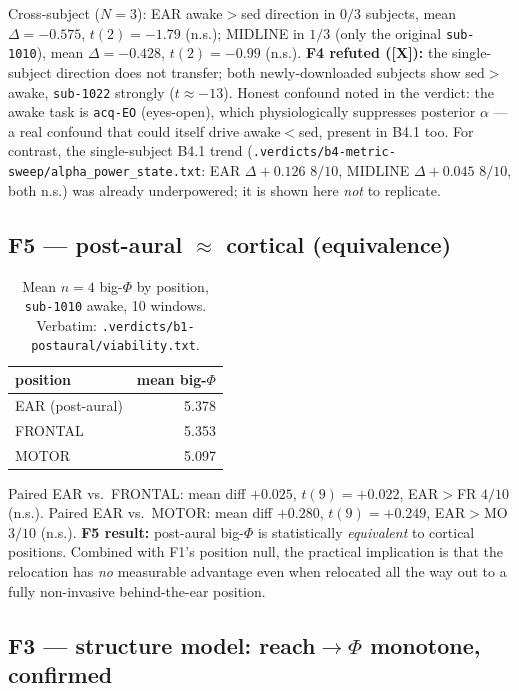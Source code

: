 \documentclass[11pt,a4paper]{article}
\providecommand{\tierRed}{\textbf{[X]}}     %
\begin{document}
\noindent
Cross-subject ($N{=}3$): EAR awake$>$sed direction in $0/3$ subjects, mean
$\Delta{=}{-}0.575$, $t(2){=}{-}1.79$ (n.s.); MIDLINE in $1/3$ (only the
original \texttt{sub-1010}), mean $\Delta{=}{-}0.428$, $t(2){=}{-}0.99$ (n.s.).
\textbf{F4 refuted (\tierRed):} the single-subject direction does not transfer;
both newly-downloaded subjects show sed$>$awake, \texttt{sub-1022} strongly
($t{\approx}{-}13$). Honest confound noted in the verdict: the awake task is
\texttt{acq-EO} (eyes-open), which physiologically suppresses posterior
$\alpha$ --- a real confound that could itself drive awake$<$sed, present in
B4.1 too. For contrast, the single-subject B4.1 trend
(\texttt{.verdicts/b4-metric-sweep/alpha\_power\_state.txt}: EAR
$\Delta{+}0.126$ $8/10$, MIDLINE $\Delta{+}0.045$ $8/10$, both n.s.) was already
underpowered; it is shown here \emph{not} to replicate.

\subsection{F5 --- post-aural $\approx$ cortical (equivalence)}
\label{sub:f5}

\begin{table}[h]
\centering
\caption{Mean $n{=}4$ big-$\Phi$ by position, \texttt{sub-1010} awake, 10
windows. Verbatim: \texttt{.verdicts/b1-postaural/viability.txt}.}
\label{tab:f5}
\small
\begin{tabular}{@{}lr@{}}
\toprule
position & mean big-$\Phi$ \\
\midrule
EAR (post-aural) & 5.378 \\
FRONTAL          & 5.353 \\
MOTOR            & 5.097 \\
\bottomrule
\end{tabular}
\end{table}

\noindent
Paired EAR vs.\ FRONTAL: mean diff $+0.025$, $t(9){=}+0.022$, EAR$>$FR $4/10$
(n.s.). Paired EAR vs.\ MOTOR: mean diff $+0.280$, $t(9){=}+0.249$, EAR$>$MO
$3/10$ (n.s.). \textbf{F5 result:} post-aural big-$\Phi$ is statistically
\emph{equivalent} to cortical positions. Combined with F1's position null, the
practical implication is that the relocation has \emph{no} measurable advantage
even when relocated all the way out to a fully non-invasive behind-the-ear
position.

\subsection{F3 --- structure model: reach$\to\Phi$ monotone, confirmed}
\label{sub:f3}
\end{document}
